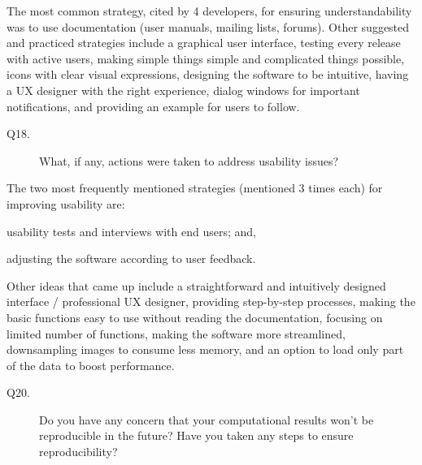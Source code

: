 \documentclass[final, 3p, times, authoryear]{elsarticle}
\begin{document}
The most common strategy, cited by 4 developers, for ensuring understandability
was to use documentation (user manuals, mailing lists, forums).  Other suggested
and practiced strategies include a graphical user interface, testing every
release with active users, making simple things simple and complicated things
possible, icons with clear visual expressions, designing the software to be
intuitive, having a UX designer with the right experience, dialog windows for
important notifications, and providing an example for users to follow.

\begin{description}
\item[Q18.] What, if any, actions were taken to address usability issues?
\end{description}

The two most frequently mentioned strategies (mentioned 3 times each) for
improving usability are:
\begin{inparaenum}[i)]
    \item usability tests and interviews with end users; and,
    \item adjusting the software according to user feedback.
\end{inparaenum}
Other ideas that came up include a straightforward and intuitively designed
interface / professional UX designer, providing step-by-step processes, making
the basic functions easy to use without reading the documentation, focusing on
limited number of functions, making the software more streamlined, downsampling
images to consume less memory, and an option to load only part of the data to
boost performance.

\begin{description}
\item[Q20.] Do you have any concern that your computational results won't be
reproducible in the future? Have you taken any steps to ensure reproducibility?
\end{description}
\end{document}
